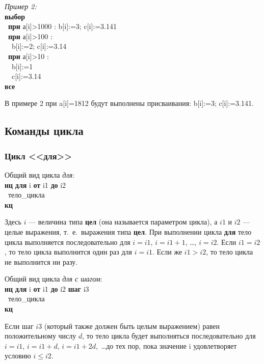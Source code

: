\documentclass[12pt,a4paper]{article}
\newcommand{\otstup}{\textperiodcentered\ }
\begin{document}
\emph{Пример 2:}\\
{\sffamily
\textbf{выбор}\\
\otstup \textbf{при} а[i]>1000 : b[i]:=3; c[i]:=3.141\\
\otstup \textbf{при} а[i]>100 :\\
\otstup \otstup b[i]:=2; c[i]:=3.14\\
\otstup \textbf{при} а[i]>10 :\\
\otstup \otstup b[i]:=1\\
\otstup \otstup c[i]:=3.14\\
\textbf{все}
}

В примере 2 при \textsf{a[i]=1812} будут выполнены присваивания: \textsf{b[i]:=3; c[i]:=3.141}.

\subsection{Команды цикла}

\subsubsection[Цикл ''для'']{Цикл <<для>>}

Общий вид цикла \emph{для}:\\
{\sffamily
\textbf{нц} \textbf{для} i \textbf{от} i1 \textbf{до} i2\\
\otstup тело\_цикла\\
\textbf{кц}
}

Здесь $i$ --- величина типа \textbf{цел} (она называется параметром цикла), а $i1$ и $i2$ --- целые выражения, т.~е.~выражения типа \textbf{цел}. При выполнении цикла \textbf{для} тело цикла выполняется последовательно для $i=i1$, $i=i1+1$, \dots, $i=i2$. Если $i1=i2$, то тело цикла выполнится один раз для $i=i1$. Если же $i1>i2$, то тело цикла не выполнится ни разу.

Общий вид цикла \emph{для с шагом}:\\
{\sffamily
\textbf{нц} \textbf{для} i \textbf{от} i1 \textbf{до} i2 \textbf{шаг} i3\\
\otstup тело\_цикла\\
\textbf{кц}
}

Если шаг $i3$ (который также должен быть целым выражением) равен положительному числу $d$, то тело цикла будет выполняться последовательно для $i=i1$, $i=i1+d$, $i=i1+2d$,~\dots до тех пор, пока значение i удовлетворяет условию $i \le i2$.
\end{document}
